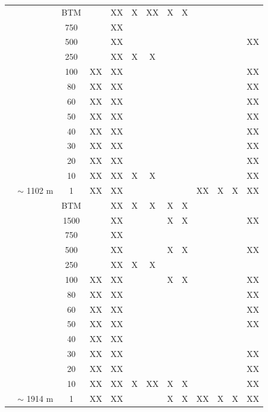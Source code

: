 \documentclass[12pt]{article}\usepackage[]{graphicx}\usepackage[]{color}
\begin{document}
\begin{landscapepage}
\begin{longtable}[t]{ccccccccccccc}
\cmidrule{1-13}\pagebreak[0]
 &  & BTM &  & XX & X & XX & X & X &  &  &  & \\
\nopagebreak
 &  & 750 &  & XX &  &  &  &  &  &  &  & \\
\nopagebreak
 &  & 500 &  & XX &  &  &  &  &  &  &  & XX\\
\nopagebreak
 &  & 250 &  & XX & X & X &  &  &  &  &  & \\
\nopagebreak
 &  & 100 & XX & XX &  &  &  &  &  &  &  & XX\\
\nopagebreak
 &  & 80 & XX & XX &  &  &  &  &  &  &  & XX\\
\nopagebreak
 &  & 60 & XX & XX &  &  &  &  &  &  &  & XX\\
\nopagebreak
 &  & 50 & XX & XX &  &  &  &  &  &  &  & XX\\
\nopagebreak
 &  & 40 & XX & XX &  &  &  &  &  &  &  & XX\\
\nopagebreak
 &  & 30 & XX & XX &  &  &  &  &  &  &  & XX\\
\nopagebreak
 &  & 20 & XX & XX &  &  &  &  &  &  &  & XX\\
\nopagebreak
 &  & 10 & XX & XX & X & X &  &  &  &  &  & XX\\
\nopagebreak
\multirow{-13}{*}{\centering\arraybackslash SG\_23} & \multirow{-13}{*}{\centering\arraybackslash $\sim$ 1102 m} & 1 & XX & XX &  &  &  &  & XX & X & X & XX\\
\cmidrule{1-13}\pagebreak[0]
 &  & BTM &  & XX & X & X & X & X &  &  &  & \\
\nopagebreak
 &  & 1500 &  & XX &  &  & X & X &  &  &  & XX\\
\nopagebreak
 &  & 750 &  & XX &  &  &  &  &  &  &  & \\
\nopagebreak
 &  & 500 &  & XX &  &  & X & X &  &  &  & XX\\
\nopagebreak
 &  & 250 &  & XX & X & X &  &  &  &  &  & \\
\nopagebreak
 &  & 100 & XX & XX &  &  & X & X &  &  &  & XX\\
\nopagebreak
 &  & 80 & XX & XX &  &  &  &  &  &  &  & XX\\
\nopagebreak
 &  & 60 & XX & XX &  &  &  &  &  &  &  & XX\\
\nopagebreak
 &  & 50 & XX & XX &  &  &  &  &  &  &  & XX\\
\nopagebreak
 &  & 40 & XX & XX &  &  &  &  &  &  &  & \\
\nopagebreak
 &  & 30 & XX & XX &  &  &  &  &  &  &  & XX\\
\nopagebreak
 &  & 20 & XX & XX &  &  &  &  &  &  &  & XX\\
\nopagebreak
 &  & 10 & XX & XX & X & XX & X & X &  &  &  & XX\\
\nopagebreak
\multirow{-14}{*}{\centering\arraybackslash GULD\_04} & \multirow{-14}{*}{\centering\arraybackslash $\sim$ 1914 m} & 1 & XX & XX &  &  & X & X & XX & X & X & XX\\*
\end{longtable}
\end{landscapepage}
\end{document}
